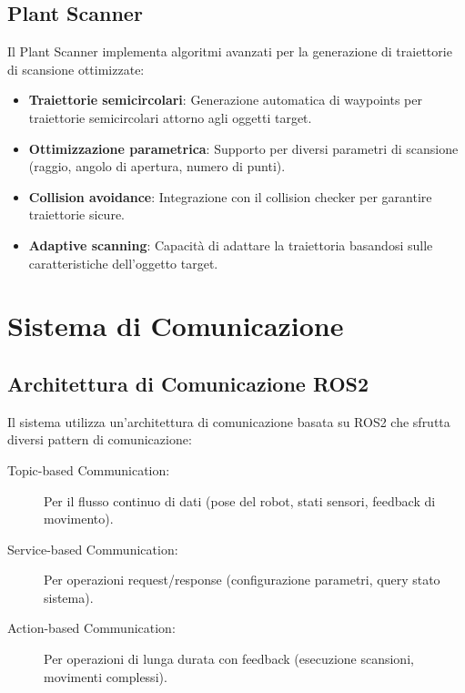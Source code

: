 \documentclass[12pt,a4paper,twoside,openright]{book}
\begin{document}
\subsection{Plant Scanner}

Il Plant Scanner implementa algoritmi avanzati per la generazione di traiettorie di scansione ottimizzate:

\begin{itemize}
    \item \textbf{Traiettorie semicircolari}: Generazione automatica di waypoints per traiettorie semicircolari attorno agli oggetti target.
    
    \item \textbf{Ottimizzazione parametrica}: Supporto per diversi parametri di scansione (raggio, angolo di apertura, numero di punti).
    
    \item \textbf{Collision avoidance}: Integrazione con il collision checker per garantire traiettorie sicure.
    
    \item \textbf{Adaptive scanning}: Capacità di adattare la traiettoria basandosi sulle caratteristiche dell'oggetto target.
\end{itemize}

\section{Sistema di Comunicazione}

\subsection{Architettura di Comunicazione ROS2}

Il sistema utilizza un'architettura di comunicazione basata su ROS2 che sfrutta diversi pattern di comunicazione:

\begin{description}
    \item[Topic-based Communication:] Per il flusso continuo di dati (pose del robot, stati sensori, feedback di movimento).
    
    \item[Service-based Communication:] Per operazioni request/response (configurazione parametri, query stato sistema).
    
    \item[Action-based Communication:] Per operazioni di lunga durata con feedback (esecuzione scansioni, movimenti complessi).
\end{description}
\end{document}
